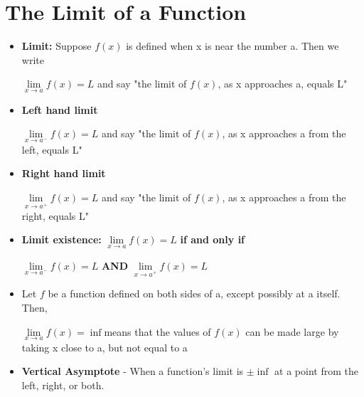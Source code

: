 \documentclass{report}
\begin{document}
		\section{The Limit of a Function}
			\begin{itemize}\addtolength{\leftskip}{2em}
				\item \textbf{Limit: }Suppose  $f(x)$ is defined when x is near the number a. Then we write
					\begin{center}
					$\lim\limits_{x \rightarrow a}f(x) =L$
					and say "the limit of $f(x)$, as x approaches a, equals L"
					\end{center}
				\item \textbf{Left hand limit}
					\begin{center}
					$\lim\limits_{x \rightarrow a^-}f(x) =L$
					and say "the limit of $f(x)$, as x approaches a from the left, equals L"
					\end{center}
				\item \textbf{Right hand limit}
					\begin{center}
					$\lim\limits_{x \rightarrow a^+}f(x) =L$
					and say "the limit of $f(x)$, as x approaches a from the right, equals L"
					\end{center}
				\item \textbf{Limit existence: }$\lim\limits_{x \rightarrow a}f(x) =L$ \textbf{if and only if} 
					\begin{center}
					$\lim\limits_{x \rightarrow a^-}f(x) =L$    \textbf{   AND   }    $\lim\limits_{x \rightarrow a^+}f(x) =L$
					\end{center}
				\item Let $f$ be a function defined on both sides of a, except possibly at a itself. Then,
					\begin{center}
					$\lim\limits_{x \rightarrow a}f(x) =\inf$\newline means that the values of $f(x)$ can be made large by taking x close to a, but not equal to a
					\end{center}
				\item \textbf{Vertical Asymptote} - When a function's limit is $\pm\inf$ at a point from the left, right, or both.
			\end{itemize}
\end{document}
